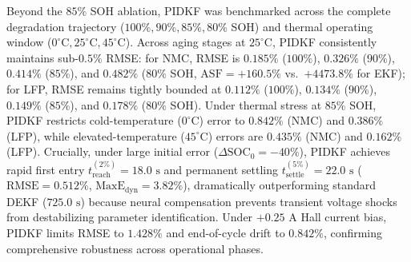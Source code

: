 \documentclass[balance,nocopyright,upint,varvw,hyphenate,barcolor=NavyBlue,nolists]{asmejour}
\begin{document}
Beyond the $85\%$ SOH ablation, PIDKF was benchmarked across the complete degradation trajectory ($100\%, 90\%, 85\%, 80\%$ SOH) and thermal operating window ($0^\circ\text{C}, 25^\circ\text{C}, 45^\circ\text{C}$). Across aging stages at $25^\circ\text{C}$, PIDKF consistently maintains sub-$0.5\%$ RMSE: for NMC, RMSE is $0.185\%$ ($100\%$), $0.326\%$ ($90\%$), $0.414\%$ ($85\%$), and $0.482\%$ ($80\%$ SOH, $\text{ASF} = +160.5\%$ vs.\ $+4473.8\%$ for EKF); for LFP, RMSE remains tightly bounded at $0.112\%$ ($100\%$), $0.134\%$ ($90\%$), $0.149\%$ ($85\%$), and $0.178\%$ ($80\%$ SOH). Under thermal stress at $85\%$ SOH, PIDKF restricts cold-temperature ($0^\circ\text{C}$) error to $0.842\%$ (NMC) and $0.386\%$ (LFP), while elevated-temperature ($45^\circ\text{C}$) errors are $0.435\%$ (NMC) and $0.162\%$ (LFP). Crucially, under large initial error ($\Delta\text{SOC}_0 = -40\%$), PIDKF achieves rapid first entry $t_{\text{reach}}^{(2\%)} = 18.0\text{ s}$ and permanent settling $t_{\text{settle}}^{(5\%)} = 22.0\text{ s}$ ($\text{RMSE} = 0.512\%$, $\text{MaxE}_{\text{dyn}} = 3.82\%$), dramatically outperforming standard DEKF ($725.0\text{ s}$) because neural compensation prevents transient voltage shocks from destabilizing parameter identification. Under $+0.25\text{ A}$ Hall current bias, PIDKF limits RMSE to $1.428\%$ and end-of-cycle drift to $0.842\%$, confirming comprehensive robustness across operational phases.
\end{document}
